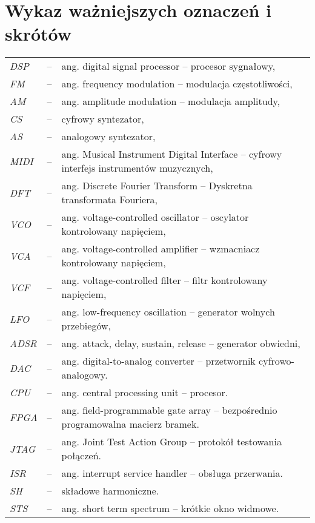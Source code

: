 \chapter*{Wykaz ważniejszych oznaczeń i skrótów}

\begin{tabular}{lcl}
	\textit{DSP} & -- & ang. digital signal processor -- procesor sygnałowy, \\
	\textit{FM} & -- & ang. frequency modulation -- modulacja częstotliwości, \\
	\textit{AM} & -- & ang. amplitude modulation -- modulacja amplitudy, \\
	\textit{CS} & -- & cyfrowy syntezator, \\
	\textit{AS} & -- & analogowy syntezator, \\
	\textit{MIDI} & -- & ang. Musical Instrument Digital Interface -- cyfrowy interfejs instrumentów muzycznych, \\
	\textit{DFT} & -- & ang. Discrete Fourier Transform -- Dyskretna transformata Fouriera, \\
	\textit{VCO} & -- & ang. voltage-controlled oscillator -- oscylator kontrolowany napięciem, \\
	\textit{VCA} & -- & ang. voltage-controlled amplifier -- wzmacniacz kontrolowany napięciem, \\
	\textit{VCF} & -- & ang. voltage-controlled filter -- filtr kontrolowany napięciem, \\
	\textit{LFO} & -- & ang. low-frequency oscillation -- generator wolnych przebiegów, \\
	\textit{ADSR} & -- & ang. attack, delay, sustain, release -- generator obwiedni, \\
	\textit{DAC} & -- & ang. digital-to-analog converter -- przetwornik cyfrowo-analogowy. \\
	\textit{CPU} & -- & ang. central processing unit -- procesor. \\
	\textit{FPGA} & -- & ang. field-programmable gate array -- bezpośrednio programowalna macierz bramek. \\
	\textit{JTAG} & -- & ang. Joint Test Action Group -- protokół testowania połączeń. \\
	\textit{ISR} & -- & ang. interrupt service handler -- obsługa przerwania. \\
	\textit{SH} & -- & składowe harmoniczne. \\
	\textit{STS} & -- & ang. short term spectrum -- krótkie okno widmowe. \\
\end{tabular} 

